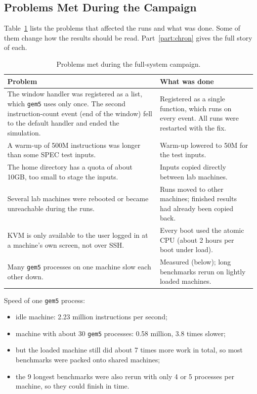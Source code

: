 \subsection{Problems Met During the Campaign}
Table~\ref{tab:campaign_issues} lists the problems that affected the runs and what was done. Some of them change how the results should be read. Part~\ref{part:chron} gives the full story of each.

\begin{table}[htbp]
\centering
\small
\caption{Problems met during the full-system campaign.}
\label{tab:campaign_issues}
\begin{tabularx}{\textwidth}{X X}
\toprule
\textbf{Problem} & \textbf{What was done} \\
\midrule
The window handler was registered as a list, which \texttt{gem5} uses only once. The second instruction-count event (end of the window) fell to the default handler and ended the simulation. & Registered as a single function, which runs on every event. All runs were restarted with the fix. \\
A warm-up of 500M instructions was longer than some SPEC test inputs. & Warm-up lowered to 50M for the test inputs. \\
The home directory has a quota of about 10GB, too small to stage the inputs. & Inputs copied directly between lab machines. \\
Several lab machines were rebooted or became unreachable during the runs. & Runs moved to other machines; finished results had already been copied back. \\
KVM is only available to the user logged in at a machine's own screen, not over SSH. & Every boot used the atomic CPU (about 2 hours per boot under load). \\
Many \texttt{gem5} processes on one machine slow each other down. & Measured (below); long benchmarks rerun on lightly loaded machines. \\
\bottomrule
\end{tabularx}
\end{table}

Speed of one \texttt{gem5} process:
\begin{itemize}
    \item idle machine: 2.23 million instructions per second;
    \item machine with about 30 \texttt{gem5} processes: 0.58 million, 3.8 times slower;
    \item but the loaded machine still did about 7 times more work in total, so most benchmarks were packed onto shared machines;
    \item the 9 longest benchmarks were also rerun with only 4 or 5 processes per machine, so they could finish in time.
\end{itemize}

